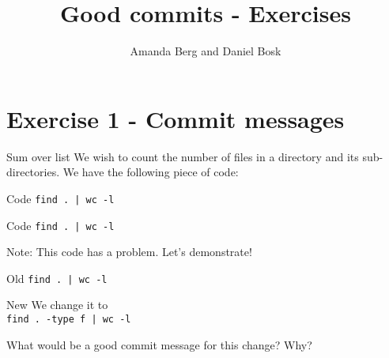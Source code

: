 \title{%
  Good commits - Exercises
}
\author{Amanda Berg and Daniel Bosk}


\mode*


\section{Exercise 1 - Commit messages}
\begin{frame}
\begin{block}{Sum over list}
    We wish to count the number of files in a directory and its sub-directories. We have the following piece of code:
\end{block}
\begin{block}{Code}
    \lstinline{find . | wc -l}
\end{block}
\end{frame}

\begin{frame}
\begin{block}{Code}
    \lstinline{find . | wc -l}
\end{block}

\begin{alertblock}{Note:}
    This code has a problem. Let's demonstrate!
\end{alertblock}
\end{frame}


\begin{frame}
\begin{block}{Old}
    \lstinline{find . | wc -l}
\end{block}

\begin{block}{New}
    We change it to \\
    \lstinline{find . -type f | wc -l}
\end{block}
\end{frame}

\begin{frame}
\begin{question}
What would be a good commit message for this change? Why? %
\end{question}    
\end{frame}

